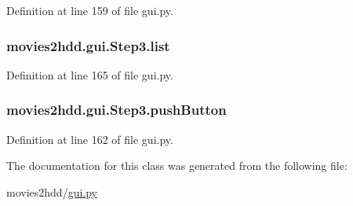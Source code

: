 Definition at line 159 of file gui.\-py.

\hypertarget{classmovies2hdd_1_1gui_1_1_step3_ab2215782905268ba4287fa1872f1618e}{
\subsubsection[{list}]{\setlength{\rightskip}{0pt plus 5cm}movies2hdd.\-gui.\-Step3.\-list}}\label{classmovies2hdd_1_1gui_1_1_step3_ab2215782905268ba4287fa1872f1618e}


Definition at line 165 of file gui.\-py.

\hypertarget{classmovies2hdd_1_1gui_1_1_step3_a3943ef1d0f93ffd6405996b301ec47d3}{
\subsubsection[{push\-Button}]{\setlength{\rightskip}{0pt plus 5cm}movies2hdd.\-gui.\-Step3.\-push\-Button}}\label{classmovies2hdd_1_1gui_1_1_step3_a3943ef1d0f93ffd6405996b301ec47d3}


Definition at line 162 of file gui.\-py.



The documentation for this class was generated from the following file\-:\begin{DoxyCompactItemize}
\item 
movies2hdd/\hyperlink{gui_8py}{gui.\-py}\end{DoxyCompactItemize}
